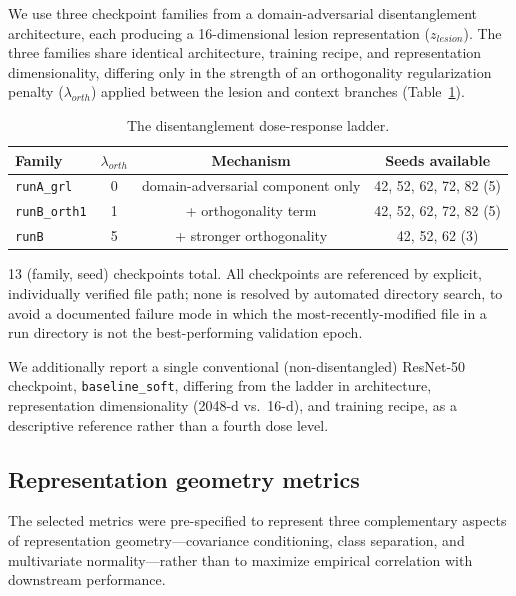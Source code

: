 We use three checkpoint families from a domain-adversarial disentanglement architecture, each producing a 16-dimensional lesion representation ($z_{lesion}$). The three families share identical architecture, training recipe, and representation dimensionality, differing only in the strength of an orthogonality regularization penalty ($\lambda_{orth}$) applied between the lesion and context branches (Table~\ref{tab:ladder-design}).

\begin{table}[htbp]
\centering
\caption{The disentanglement dose-response ladder.}
\label{tab:ladder-design}
\begin{tabular}{lccc}
\toprule
Family & $\lambda_{orth}$ & Mechanism & Seeds available \\
\midrule
\texttt{runA\_grl}   & 0 & domain-adversarial component only & 42, 52, 62, 72, 82 (5) \\
\texttt{runB\_orth1} & 1 & + orthogonality term               & 42, 52, 62, 72, 82 (5) \\
\texttt{runB}        & 5 & + stronger orthogonality           & 42, 52, 62 (3) \\
\bottomrule
\end{tabular}
\end{table}

13 (family, seed) checkpoints total. All checkpoints are referenced by explicit, individually verified file path; none is resolved by automated directory search, to avoid a documented failure mode in which the most-recently-modified file in a run directory is not the best-performing validation epoch.

We additionally report a single conventional (non-disentangled) ResNet-50 checkpoint, \texttt{baseline\_soft}, differing from the ladder in architecture, representation dimensionality (2048-d vs.\ 16-d), and training recipe, as a descriptive reference rather than a fourth dose level.

\subsection{Representation geometry metrics}
\label{sec:geometry-metrics}

The selected metrics were pre-specified to represent three complementary aspects of representation geometry---covariance conditioning, class separation, and multivariate normality---rather than to maximize empirical correlation with downstream performance.

